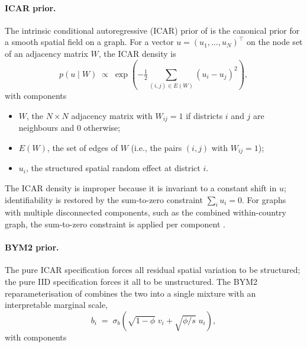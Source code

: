 \documentclass{article}
\begin{document}
\paragraph{ICAR prior.}

The intrinsic conditional autoregressive (ICAR) prior of
\citep{besag1991} is the canonical prior for a smooth spatial field on a
graph. For a vector \(u = (u_1, \ldots, u_N)^{\top}\) on the node set of
an adjacency matrix \(W\), the ICAR density is \begin{equation}
p(u \mid W) \;\propto\; \exp\!\left( -\tfrac{1}{2} \sum_{(i, j) \in E(W)} (u_i - u_j)^{2} \right),
\label{eq:icar}
\end{equation} with components

\begin{itemize}
\item $W$, the $N \times N$ adjacency matrix with $W_{ij} = 1$ if districts $i$ and $j$ are neighbours and $0$ otherwise;
\item $E(W)$, the set of edges of $W$ (i.e., the pairs $(i, j)$ with $W_{ij} = 1$);
\item $u_i$, the structured spatial random effect at district $i$.
\end{itemize}

The ICAR density is improper because it is invariant to a constant shift
in \(u\); identifiability is restored by the sum-to-zero constraint
\(\sum_i u_i = 0\). For graphs with multiple disconnected components,
such as the combined within-country graph, the sum-to-zero constraint is
applied per component \citep{freni2018}.

\paragraph{BYM2 prior.}

The pure ICAR specification forces all residual spatial variation to be
structured; the pure IID specification forces it all to be unstructured.
The BYM2 reparameterisation of \citep{riebler2016} combines the two into
a single mixture with an interpretable marginal scale, \begin{equation}
b_i \;=\; \sigma_b \left( \sqrt{1 - \phi} \; v_i + \sqrt{\phi / s} \; u_i \right),
\label{eq:bym2}
\end{equation} with components
\end{document}
